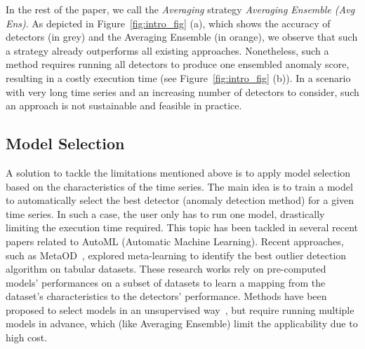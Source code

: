 In the rest of the paper, we call the \textit{Averaging} strategy \textit{Averaging Ensemble (Avg Ens)}. As depicted in Figure~\ref{fig:intro_fig} (a), which shows the accuracy of detectors (in grey) and the Averaging Ensemble (in orange), we observe that such a strategy already outperforms all existing approaches. Nonetheless, such a method requires running all detectors to produce one ensembled anomaly score, resulting in a costly execution time (see Figure~\ref{fig:intro_fig} (b)). In a scenario with very long time series and an increasing number of detectors to consider, such an approach is not sustainable and feasible in practice.

\vspace{-0.1cm}
\subsection{Model Selection}

A solution to tackle the limitations mentioned above is to apply model selection based on the characteristics of the time series. The main idea is to train a model to automatically select the best detector (anomaly detection method) for a given time series. In such a case, the user only has to run one model, drastically limiting the execution time required. This topic has been tackled in several recent papers related to AutoML (Automatic Machine Learning). Recent approaches, such as MetaOD~\cite{NEURIPS2021_23c89427, https://doi.org/10.48550/arxiv.2009.04395}, explored meta-learning to identify the best outlier detection algorithm on tabular datasets. 
These research works rely on pre-computed models' performances on a subset of datasets to learn a mapping from the dataset's characteristics to the detectors' performance. Methods have been proposed to select models in an unsupervised way~\cite{https://doi.org/10.48550/arxiv.2210.01078}, but require running multiple models in advance, which (like Averaging Ensemble) limit the applicability due to high cost.

